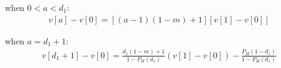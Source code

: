 \documentclass[12pt, letterpaper]{article}
\begin{document}
when $0<a<d_1$:
\begin{equation}
\begin{aligned}
v[a]-v[0] = [(a-1)(1-m)+1][v[1]-v[0]]
\end{aligned}
\end{equation}

when $a=d_1+1$:
\begin{equation}
\begin{aligned}
v[d_1+1]-v[0] = \frac{d_1 (1-m)+1}{1-P_{H}(d_1)}(v[1]-v[0]) - \frac{P_{H}(1-d_1)}{1-P_{H}(d_1)}
\end{aligned}
\end{equation}

% 
\end{document}
